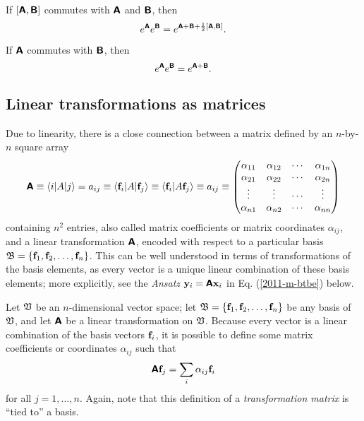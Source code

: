If $[\textsf{\textbf{A}},\textsf{\textbf{B}}]$ commutes with $\textsf{\textbf{A}}$ and
$\textsf{\textbf{B}}$, then
 \begin{equation}
 e^\textsf{\textbf{A}}e^\textsf{\textbf{B}}=
e^{\textsf{\textbf{A}}+\textsf{\textbf{B}}+{1\over 2}\left[\textsf{\textbf{A}},\textsf{\textbf{B}}\right]}.
 \end{equation}

If  $\textsf{\textbf{A}}$ commutes with $\textsf{\textbf{B}}$, then
 \begin{equation}
 e^\textsf{\textbf{A}}e^\textsf{\textbf{B}}=
e^{\textsf{\textbf{A}}+\textsf{\textbf{B}}}.
 \end{equation}

\subsection{Linear transformations as matrices}


Due to linearity, there is a close connection between a matrix
defined by an $n$-by-$n$ square array
\begin{equation}
\textsf{\textbf{A}}
\equiv \langle i\vert A\vert j\rangle = a_{ij}
\equiv \langle {\bf f}_i \vert A \vert {\bf f}_j\rangle
\equiv \langle {\bf f}_i \vert A   {\bf f}_j\rangle
\equiv a_{ij}
\equiv
\begin{pmatrix}
\alpha_{11}&
\alpha_{12}&
\cdots    &
\alpha_{1n}\\
\alpha_{21}&
\alpha_{22}&
\cdots    &
\alpha_{2n}\\
\vdots&
\vdots&
\cdots    &
\vdots\\
\alpha_{n1}&
\alpha_{n2}&
\cdots   &
\alpha_{nn}
\end{pmatrix}
\end{equation}
containing $n^2$ entries,
also called matrix coefficients or matrix coordinates $\alpha_{ij}$, and a linear transformation
$\textsf{\textbf{A}}$, encoded with respect to a particular basis ${\frak B}= \{{\bf f}_1,{\bf f}_2,\ldots ,{\bf f}_n\}$.
This can be well understood in terms of transformations of the basis elements,
as every vector is a unique linear combination of these basis elements;
more explicitly, see the {\it Ansatz} ${\bf y}_i=  \textsf{\textbf{A}}{\bf x}_i $ in Eq. (\ref{2011-m-btbe}) below.


Let ${\frak V}$ be an $n$-dimensional vector space;
let
${\frak B}=\{{\bf f}_1,{\bf f}_2,\ldots ,{\bf f}_n\}$ be any basis of ${\frak V}$,
and let  $\textsf{\textbf{A}}$ be a linear transformation on ${\frak V}$.
Because every vector is a linear combination of the basis vectors
${\bf f}_i$,
it is possible to define some matrix coefficients or coordinates
$\alpha_{ij}$ such that
\begin{equation}
\textsf{\textbf{A}} {\bf f}_j = \sum_i \alpha_{ij}{\bf f}_i
\end{equation}
for all $j=1,\ldots ,n$.
Again, note that this definition of a {\em transformation matrix}
is ``tied to'' a basis.

